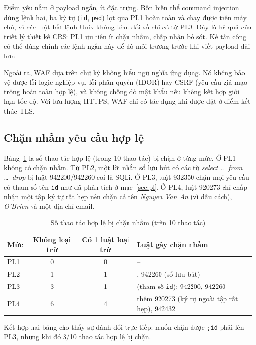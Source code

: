 Điểm yếu nằm ở payload ngắn, ít đặc trưng. Bốn biến thể command injection dùng lệnh hai, ba ký tự (\texttt{id}, \texttt{pwd}) lọt qua PL1 hoàn toàn và chạy được trên máy chủ, vì các luật bắt lệnh Unix không kèm đối số chỉ có từ PL3. Đây là hệ quả của triết lý thiết kế CRS: PL1 ưu tiên ít chặn nhầm, chấp nhận bỏ sót. Kẻ tấn công có thể dùng chính các lệnh ngắn này để dò môi trường trước khi viết payload dài hơn.

Ngoài ra, WAF dựa trên chữ ký không hiểu ngữ nghĩa ứng dụng. Nó không bảo vệ được lỗi logic nghiệp vụ, lỗi phân quyền (IDOR) hay CSRF (yêu cầu giả mạo trông hoàn toàn hợp lệ), và không chống dò mật khẩu nếu không kết hợp giới hạn tốc độ. Với lưu lượng HTTPS, WAF chỉ có tác dụng khi được đặt ở điểm kết thúc TLS.

\subsection{Chặn nhầm yêu cầu hợp lệ}
Bảng~\ref{tab:fp} là số thao tác hợp lệ (trong 10 thao tác) bị chặn ở từng mức. Ở PL1 không có chặn nhầm. Từ PL2, một lời nhắn sổ lưu bút có các từ \textit{select \ldots\ from \ldots\ drop} bị luật 942200/942260 coi là SQLi. Ở PL3, luật 932350 chặn mọi yêu cầu có tham số tên \texttt{id} như đã phân tích ở mục~\ref{sec:pl}. Ở PL4, luật 920273 chỉ chấp nhận một tập ký tự rất hẹp nên chặn cả tên \textit{Nguyen Van An} (vì dấu cách), \textit{O'Brien} và một địa chỉ email.

\begin{table}[!htb]
\centering
\caption{Số thao tác hợp lệ bị chặn nhầm (trên 10 thao tác)}
\label{tab:fp}
\footnotesize
\begin{tabularx}{\linewidth}{@{}lcc>{\raggedright\arraybackslash}X@{}}
\toprule
\textbf{Mức} & \textbf{Không loại trừ} & \textbf{Có 1 luật loại trừ} & \textbf{Luật gây chặn nhầm} \\ \midrule
PL1 & 0 & 0 & -- \\
PL2 & 1 & 1 & 942200, 942260 (sổ lưu bút) \\
PL3 & 3 & 1 & 932350 (tham số \texttt{id}); 942200, 942260 \\
PL4 & 6 & 4 & thêm 920273 (ký tự ngoài tập rất hẹp), 942432 \\
\bottomrule
\end{tabularx}
\end{table}

Kết hợp hai bảng cho thấy sự đánh đổi trực tiếp: muốn chặn được \texttt{;id} phải lên PL3, nhưng khi đó 3/10 thao tác hợp lệ bị chặn.

